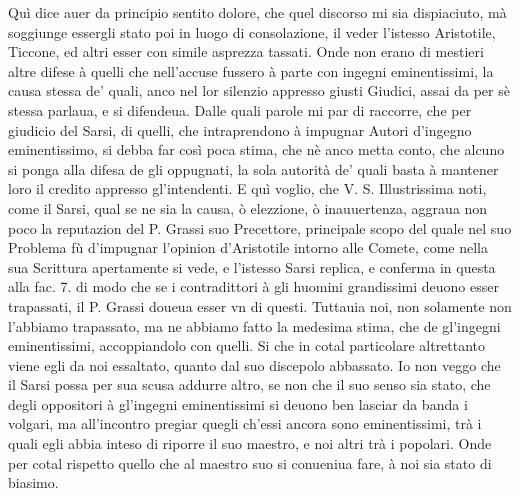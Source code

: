 \documentclass[11pt,twoside,openany]{book}
\begin{document}
Quì dice auer da principio sentito dolore, che quel discorso mi sia dispiaciuto, mà soggiunge essergli stato poi in luogo di consolazione, il veder l'istesso Aristotile, Ticcone, ed altri esser con simile asprezza tassati. Onde non erano di mestieri altre difese à quelli che nell'accuse fussero à parte con ingegni eminentissimi, la causa stessa de' quali, anco nel lor silenzio appresso giusti Giudici, assai da per sè stessa parlaua, e si difendeua. Dalle quali parole mi par di raccorre, che per giudicio del Sarsi, di quelli, che intraprendono à impugnar Autori d'ingegno eminentissimo, si debba far così poca stima, che nè anco metta conto, che alcuno si ponga alla difesa de gli oppugnati, la sola autorità de' quali basta à mantener loro il credito appresso gl'intendenti. E quì voglio, che V. S. Illustrissima noti, come il Sarsi, qual se ne sia la causa, ò elezzione, ò inauuertenza, aggraua non poco la reputazion del P. Grassi suo Precettore, principale scopo del quale nel suo Problema fù d'impugnar l'opinion d'Aristotile intorno alle Comete, come nella sua Scrittura apertamente si vede, e l'istesso Sarsi replica, e conferma in questa alla fac. 7. di modo che se i contradittori à gli huomini grandissimi deuono esser trapassati, il P. Grassi doueua esser vn di questi. Tuttauia noi, non solamente non l'abbiamo trapassato, ma ne abbiamo fatto la medesima stima, che de gl'ingegni eminentissimi, accoppiandolo con quelli. Si che in cotal particolare altrettanto viene egli da noi essaltato, quanto dal suo discepolo abbassato. Io non veggo che il Sarsi possa per sua scusa addurre altro, se non che il suo senso sia stato, che degli oppositori à gl'ingegni eminentissimi si deuono ben lasciar da banda i volgari, ma all'incontro pregiar quegli ch'essi ancora sono eminentissimi, trà i quali egli abbia inteso di riporre il suo maestro, e noi altri trà i popolari. Onde per cotal rispetto quello che al maestro suo si conueniua fare, à noi sia stato di biasimo.
\end{document}
